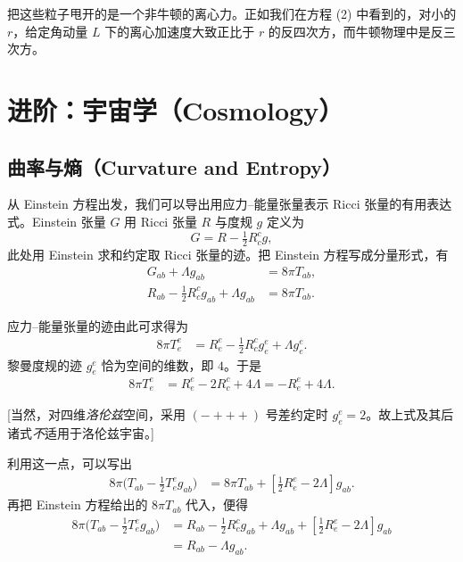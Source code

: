 把这些粒子甩开的是一个非牛顿的离心力。正如我们在方程 (2) 中看到的，对小的 $r$，给定角动量 $L$ 下的离心加速度大致正比于 $r$ 的反四次方，而牛顿物理中是反三次方。

\section{进阶：宇宙学（Cosmology）}

\subsection{曲率与熵（Curvature and Entropy）}

从 Einstein 方程出发，我们可以导出用应力--能量张量表示 Ricci 张量的有用表达式。Einstein 张量 $G$ 用 Ricci 张量 $R$ 与度规 $g$ 定义为
\begin{equation*}
G=R-\tfrac{1}{2}R_{c}^{c}g,
\end{equation*}
此处用 Einstein 求和约定取 Ricci 张量的迹。把 Einstein 方程写成分量形式，有
\begin{align*}
G_{ab}+\Lambda g_{ab} &= 8\pi T_{ab},\\
R_{ab}-\tfrac{1}{2}R_{c}^{c}g_{ab}+\Lambda g_{ab} &= 8\pi T_{ab}.
\end{align*}

应力--能量张量的迹由此可求得为
\begin{align*}
8\pi T_{e}^{e} &= R_{e}^{e}-\tfrac{1}{2}R_{c}^{c}g_{e}^{e}+\Lambda g_{e}^{e}.
\end{align*}
黎曼度规的迹 $g_{e}^{e}$ 恰为空间的维数，即 $4$。于是
\begin{align*}
8\pi T_{e}^{e} &= R_{e}^{e}-2R_{c}^{c}+4\Lambda = -R_{e}^{e}+4\Lambda.
\end{align*}

[当然，对四维\emph{洛伦兹}空间，采用 $(-+++)$ 号差约定时 $g_{e}^{e}=2$。故上式及其后诸式\emph{不}适用于洛伦兹宇宙。]

利用这一点，可以写出
\begin{align*}
8\pi\bigl(T_{ab}-\tfrac{1}{2}T_{e}^{e}g_{ab}\bigr) &= 8\pi T_{ab}+\left[\tfrac{1}{2}R_{e}^{e}-2\Lambda\right]g_{ab}.
\end{align*}
再把 Einstein 方程给出的 $8\pi T_{ab}$ 代入，便得
\begin{align*}
8\pi\bigl(T_{ab}-\tfrac{1}{2}T_{e}^{e}g_{ab}\bigr)
&= R_{ab}-\tfrac{1}{2}R_{c}^{c}g_{ab}+\Lambda g_{ab}
 +\left[\tfrac{1}{2}R_{e}^{e}-2\Lambda\right]g_{ab} \nonumber\\
&= R_{ab}-\Lambda g_{ab}.
\end{align*}

